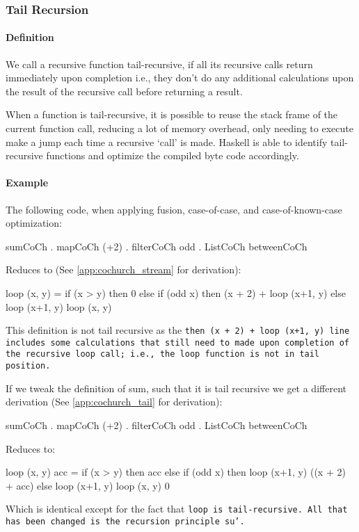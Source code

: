
\subsubsection{Tail Recursion}\label{sec:tail}
\paragraph{Definition}
We call a recursive function tail-recursive, if all its recursive calls return immediately upon completion i.e., they don't do any additional calculations upon the result of the recursive call before returning a result.

When a function is tail-recursive, it is possible to reuse the stack frame of the current function call, reducing a lot of memory overhead, only needing to execute make a jump each time a recursive `call' is made.
Haskell is able to identify tail-recursive functions and optimize the compiled byte code accordingly.

\paragraph{Example}
The following code, when applying fusion, case-of-case, and case-of-known-case optimization:
\begin{spec}
sumCoCh . mapCoCh (+2) . filterCoCh odd . ListCoCh betweenCoCh
\end{spec}
Reduces to (See \autoref{app:cochurch_stream} for derivation):
\begin{spec}
loop (x, y) = if (x > y)
              then 0
              else if (odd x)
                   then (x + 2) + loop (x+1, y)
                   else loop (x+1, y)
loop (x, y)
\end{spec}
This definition is not tail recursive as the \tt{then (x + 2) + loop (x+1, y)} line includes some calculations that still need to made upon completion of the recursive \tt{loop} call; i.e., the \tt{loop} function is not in tail position.

If we tweak the definition of sum, such that it is tail recursive we get a different derivation (See \autoref{app:cochurch_tail} for derivation):
\begin{spec}
sumCoCh . mapCoCh (+2) . filterCoCh odd . ListCoCh betweenCoCh
\end{spec}
Reduces to:
\begin{spec}
loop (x, y) acc = if (x > y)
                  then acc
                  else if (odd x)
                       then loop (x+1, y) ((x + 2) + acc)
                       else loop (x+1, y)
loop (x, y) 0
\end{spec}
Which is identical except for the fact that \tt{loop} is tail-recursive.
All that has been changed is the recursion principle \tt{su'}.

